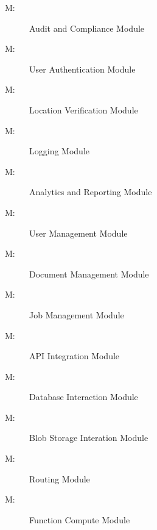 \documentclass[12pt, titlepage]{article}
\newcounter{mnum}
\newcommand{\mthemnum}{M\themnum}
\begin{document}
\begin{description}
  \item [ \mthemnum \label{mAC}:] Audit and
    Compliance Module
  \item [ \mthemnum \label{mUA}:] User
    Authentication Module
  \item [ \mthemnum \label{mLV}:] Location Verification
    Module
  \item [ \mthemnum \label{mLM}:] Logging Module
  \item [ \mthemnum \label{mAR}:] Analytics and Reporting
    Module
  \item [ \mthemnum \label{mUM}:] User Management Module
  \item [ \mthemnum \label{mDM}:] Document
    Management Module
  \item [ \mthemnum \label{mJM}:] Job Management Module
  \item [ \mthemnum \label{mAI}:] API Integration Module
  \item [ \mthemnum \label{mDI}:] Database
    Interaction Module
  \item [ \mthemnum \label{mBS}:] Blob Storage Interation
    Module
  \item [ \mthemnum \label{mRR}:] Routing Module
  \item [ \mthemnum \label{mFC}:] Function Compute Module
\end{description}
\end{document}

